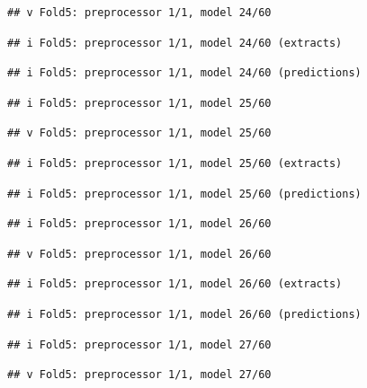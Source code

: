 \documentclass[
]{article}
\begin{document}
\begin{verbatim}
## v Fold5: preprocessor 1/1, model 24/60
\end{verbatim}

\begin{verbatim}
## i Fold5: preprocessor 1/1, model 24/60 (extracts)
\end{verbatim}

\begin{verbatim}
## i Fold5: preprocessor 1/1, model 24/60 (predictions)
\end{verbatim}

\begin{verbatim}
## i Fold5: preprocessor 1/1, model 25/60
\end{verbatim}

\begin{verbatim}
## v Fold5: preprocessor 1/1, model 25/60
\end{verbatim}

\begin{verbatim}
## i Fold5: preprocessor 1/1, model 25/60 (extracts)
\end{verbatim}

\begin{verbatim}
## i Fold5: preprocessor 1/1, model 25/60 (predictions)
\end{verbatim}

\begin{verbatim}
## i Fold5: preprocessor 1/1, model 26/60
\end{verbatim}

\begin{verbatim}
## v Fold5: preprocessor 1/1, model 26/60
\end{verbatim}

\begin{verbatim}
## i Fold5: preprocessor 1/1, model 26/60 (extracts)
\end{verbatim}

\begin{verbatim}
## i Fold5: preprocessor 1/1, model 26/60 (predictions)
\end{verbatim}

\begin{verbatim}
## i Fold5: preprocessor 1/1, model 27/60
\end{verbatim}

\begin{verbatim}
## v Fold5: preprocessor 1/1, model 27/60
\end{verbatim}
\end{document}

